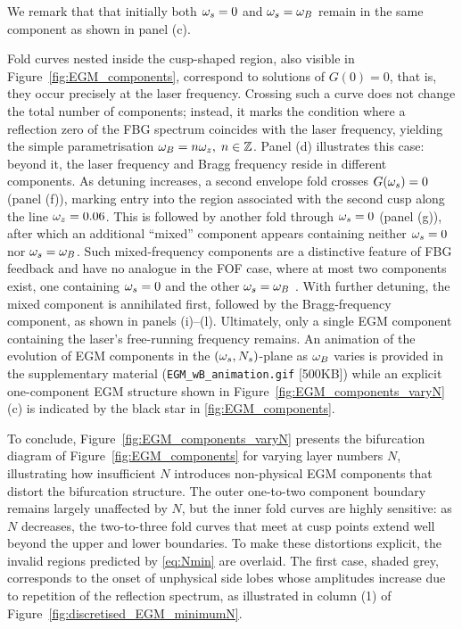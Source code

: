 We remark that that initially both $\omega_s=0$ and $\omega_s=\omega_B$ remain in the same component as shown in panel (c).
%
\par
%
Fold curves nested inside the cusp-shaped region, also visible in Figure~\ref{fig:EGM_components}, correspond to solutions of $G(0)=0$, that is, they occur precisely at the laser frequency.
Crossing such a curve does not change the total number of components; instead, it marks the condition where a reflection zero of the FBG spectrum coincides with the laser frequency, yielding the simple parametrisation $\omega_B = n\omega_z, \; n \in \mathbb{Z}$.
Panel (d) illustrates this case: beyond it, the laser frequency and Bragg frequency reside in different components.
As detuning increases, a second envelope fold crosses $G(\omega_s)=0$ (panel (f)), marking entry into the region associated with the second cusp along the line $\omega_z = 0.06$.
This is followed by another fold through $\omega_s=0$ (panel (g)), after which an additional “mixed” component appears containing neither $\omega_s=0$ nor $\omega_s=\omega_B$.
Such mixed-frequency components are a distinctive feature of FBG feedback and have no analogue in the FOF case, where at most two components exist, one containing $\omega_s=0$ and the other $\omega_s=\omega_B$ \cite{green2006mode}.
With further detuning, the mixed component is annihilated first, followed by the Bragg-frequency component, as shown in panels (i)--(l).
Ultimately, only a single EGM component containing the laser’s free-running frequency remains.
An animation of the evolution of EGM components in the $(\omega_s, N_s)$-plane as $\omega_B$ varies is provided in the supplementary material (\texttt{EGM\_wB\_animation.gif} [500KB]) while an explicit one-component EGM structure shown in Figure~\ref{fig:EGM_components_varyN}(c) is indicated by the black star in \ref{fig:EGM_components}.
%
\par
%
To conclude, Figure~\ref{fig:EGM_components_varyN} presents the bifurcation diagram of Figure~\ref{fig:EGM_components} for varying layer numbers $N$, illustrating how insufficient $N$ introduces non-physical EGM components that distort the bifurcation structure.
The outer one-to-two component boundary remains largely unaffected by $N$, but the inner fold curves are highly sensitive: as $N$ decreases, the two-to-three fold curves that meet at cusp points extend well beyond the upper and lower boundaries.
To make these distortions explicit, the invalid regions predicted by \eqref{eq:Nmin} are overlaid.
The first case, shaded grey, corresponds to the onset of unphysical side lobes whose amplitudes increase due to repetition of the reflection spectrum, as illustrated in column (1) of Figure~\ref{fig:discretised_EGM_minimumN}.
